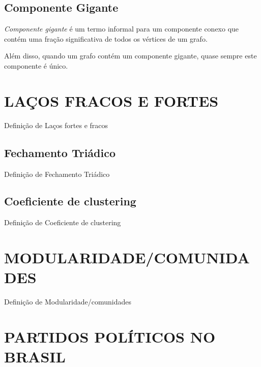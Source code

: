 \subsection{Componente Gigante}
\label{conceitos__grafo--componente-gigante}

\emph{Componente gigante} é um termo informal para um componente conexo que contém uma fração significativa de todos os vértices de um grafo.

Além disso, quando um grafo contém um componente gigante, quase sempre este componente é único.


\section{\texorpdfstring{\MakeUppercase{Laços Fracos e Fortes}}{}}
\label{conceitos__lacos-fortes-fracos}

Definição de Laços fortes e fracos

\subsection{Fechamento Triádico}
\label{conceitos__lacos-fortes-fracos--fechamento-triadico}

Definição de Fechamento Triádico

\subsection{Coeficiente de clustering}
\label{conceitos__lacos-fortes-fracos--coeficiente-clustering}

Definição de Coeficiente de clustering

\section{\texorpdfstring{\MakeUppercase{Modularidade/comunidades}}{}}
\label{conceitos__modularidade}

Definição de Modularidade/comunidades

\section{\texorpdfstring{\MakeUppercase{Partidos Políticos no Brasil}}{}}
\label{secao_partidos_brasil}

